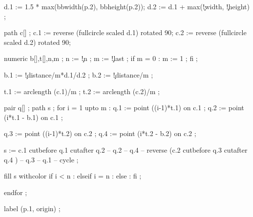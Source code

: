   d.1 := 1.5 * max(bbwidth(p.2), bbheight(p.2));
  d.2 := d.1 + max(\visualcounterparameter\c!width, \visualcounterparameter\c!height) ;

  path c[] ;
  c.1 := reverse (fullcircle scaled d.1) rotated 90;
  c.2 := reverse (fullcircle scaled d.2) rotated 90;

  numeric b[],t[],n,m ;
  n := \visualcounterparameter\c!n ;
  m := \visualcounterparameter\c!last ;
  if m = 0 : m := 1 ; fi ;

  b.1 := \visualcounterparameter\c!distance/m*d.1/d.2 ;
  b.2 := \visualcounterparameter\c!distance/m ;

  t.1 := arclength (c.1)/m ;
  t.2 := arclength (c.2)/m ;

  pair q[] ;
  path s ;
  for i = 1 upto m : 
    q.1 := point ((i-1)*t.1)        on c.1 ;
    q.2 := point (i*t.1 - b.1)  on c.1 ;

    q.3 := point ((i-1)*t.2)        on c.2 ;
    q.4 := point (i*t.2 - b.2)  on c.2 ;

    s := c.1 cutbefore q.1 cutafter q.2 -- q.2 -- q.4
       -- reverse (c.2 cutbefore q.3 cutafter q.4 ) -- q.3 -- q.1 
       -- cycle ;

    fill s withcolor 
      if i < n     :  
      elseif i = n : 
      else         : 
      fi ;

  endfor ;


  label (p.1, origin) ;


\stopuseMPgraphic

\protect

